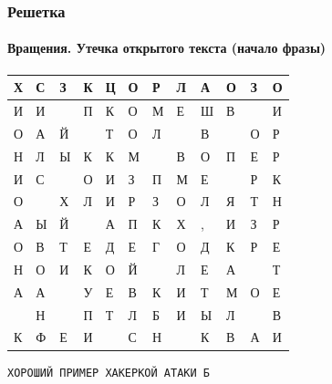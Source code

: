 \begin{frame}[fragile]
    \frametitle{Решетка}
    \framesubtitle{Вращения. Утечка открытого текста (начало фразы)}
    
    \begin{table}[ht]
        \centering
        \begin{tabular}[c]{|l@{}|l@{}|l@{}|l@{}|l@{}|l@{}|l@{}|l@{}|l@{}|l@{}|l@{}|l@{}|}
            \hline
            Х&С&З&К&Ц&О&Р&Л&А&О&З&О\\ \hline 
            И&И& &П&К&О&М&Е&Ш&В& &И\\ \hline 
            О&А&Й& &Т&О&Л& &В& &О&Р\\ \hline 
            Н&Л&Ы&К&К&М& &В&О&П&Е&Р\\ \hline 
            И&С& &О&И&З&П&М&Е& &Р&К\\ \hline 
            О& &Х&Л&И&Р&З&О&Л&Я&Т&Н\\ \hline 
            А&Ы&Й& &А&П&К&Х&,&И&З&Р\\ \hline 
            О&В&Т&Е&Д&Е&Г&О&Д&К&Р&Е\\ \hline 
            Н&О&И&К&О&Й& &Л&Е&А& &Т\\ \hline 
            А&А& &У&Е&В&К&И&Т&М&О&Е\\ \hline 
             &Н& &П&Т&Л&Б&И&Ы&Л& &В\\ \hline 
            К&Ф&Е&И& &С&Н& &К&В&А&И\\ \hline 
        \end{tabular}
    \end{table}
\begin{verbatim}
ХОРОШИЙ ПРИМЕР ХАКЕРКОЙ АТАКИ Б
\end{verbatim}
\end{frame}


